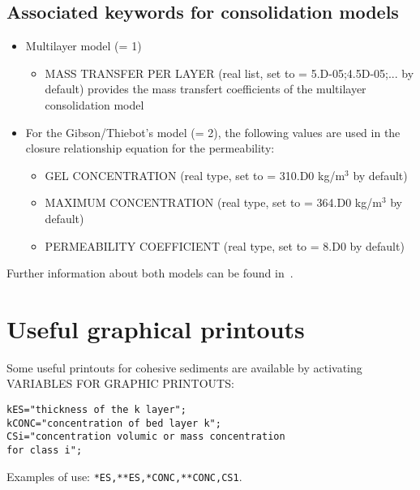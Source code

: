 \subsection{Associated keywords for consolidation models}
\begin{itemize}
\item Multilayer model ({\ttfamily = 1})
\begin{itemize}
\item {\ttfamily MASS TRANSFER PER LAYER} (real list, set to {\ttfamily = 5.D-05;4.5D-05;...} by default) provides the mass transfert coefficients of the multilayer consolidation model %
\end{itemize} 
\item For the Gibson/Thiebot's model ({\ttfamily = 2}), the following values are used in the closure relationship equation for the permeability:
\begin{itemize}
\item {\ttfamily GEL CONCENTRATION} (real type, set to {\ttfamily = 310.D0} kg/m$^3$ by default)
\item {\ttfamily MAXIMUM CONCENTRATION} (real type, set to {\ttfamily = 364.D0} kg/m$^3$ by default)
\item {\ttfamily PERMEABILITY COEFFICIENT} (real type, set to {\ttfamily = 8.D0} by default) %
\end{itemize}
\end{itemize}

Further information about both models can be found in~\cite{Lan12}.

\section{Useful graphical printouts}
Some useful printouts for cohesive sediments are available by activating {\ttfamily VARIABLES FOR GRAPHIC PRINTOUTS}:
\begin{lstlisting}[frame=trBL]  
kES="thickness of the k layer";
kCONC="concentration of bed layer k";
CSi="concentration volumic or mass concentration 
for class i";
\end{lstlisting}  
Examples of use: \texttt{*ES,**ES,*CONC,**CONC,CS1}.
